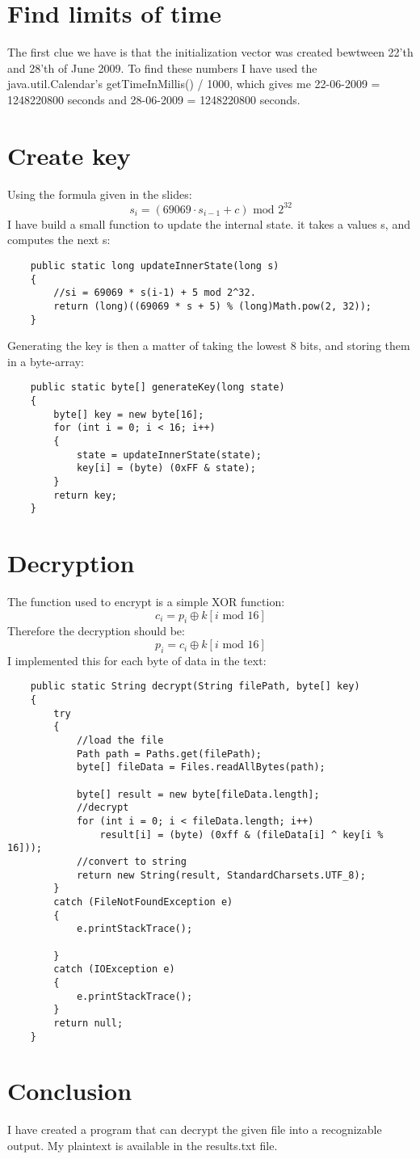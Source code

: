 \section*{Find limits of time}
The first clue we have is that the initialization vector was created bewtween
22'th and 28'th of June 2009. To find these numbers I have used the
java.util.Calendar's getTimeInMillis() / 1000, which gives me  22-06-2009 =
1248220800 seconds and 28-06-2009 = 1248220800 seconds.

\section*{Create key}
Using the formula given in the slides:
\begin{equation}
s_i=(69069 \cdot s_{i-1} + c) \text{ mod }2^{32}
\end{equation}
I have build a small function to update the internal state. it takes a values
s, and computes the next s:
\begin{lstlisting}
	public static long updateInnerState(long s)
	{
		//si = 69069 * s(i-1) + 5 mod 2^32.
		return (long)((69069 * s + 5) % (long)Math.pow(2, 32));
	}
\end{lstlisting}
Generating the key is then a matter of taking the lowest 8 bits, and storing
them in a byte-array:
\begin{lstlisting}
	public static byte[] generateKey(long state)
	{
		byte[] key = new byte[16];
		for (int i = 0; i < 16; i++)
		{
			state = updateInnerState(state);
			key[i] = (byte) (0xFF & state);
		}
		return key;
	}
\end{lstlisting}
\section*{Decryption}
The function used to encrypt is a simple XOR function:
\begin{equation}
c_i=p_i \oplus k[i \text{ mod } 16]
\end{equation}
Therefore the decryption should be:
\begin{equation}
p_i=c_i \oplus k[i \text{ mod } 16]
\end{equation}
I implemented this for each byte of data in the text:
\begin{lstlisting}
	public static String decrypt(String filePath, byte[] key)
	{
		try
		{	
			//load the file		
			Path path = Paths.get(filePath);
			byte[] fileData = Files.readAllBytes(path);
		    
		    byte[] result = new byte[fileData.length];
		    //decrypt
		    for (int i = 0; i < fileData.length; i++)
				result[i] = (byte) (0xff & (fileData[i] ^ key[i % 16]));
		    //convert to string
		    return new String(result, StandardCharsets.UTF_8);
		}
		catch (FileNotFoundException e)
		{
			e.printStackTrace();
			
		}
		catch (IOException e)
		{
			e.printStackTrace();
		}
		return null;
	}
\end{lstlisting}

\section*{Conclusion}
I have created a program that can decrypt the given file into a recognizable
output. My plaintext is available in the results.txt file.
